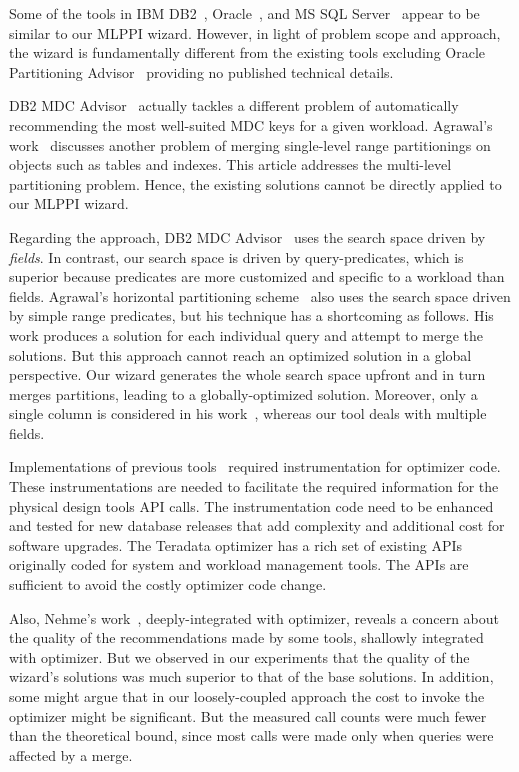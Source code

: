 \documentclass[paper]{ieice}
\begin{document}
Some of the tools in IBM DB2~\cite{Lightstone04:db2auto}, 
Oracle~\cite{sheet2009oracle}, and MS SQL Server~\cite{agrawal04:integrating} 
appear to be similar to our MLPPI wizard. 
However, in light of problem scope and approach, the wizard 
is fundamentally different from the existing tools excluding Oracle Partitioning \hbox{Advisor}~\cite{sheet2009oracle} 
providing no published technical details. 

DB2 MDC Advisor~\cite{Lightstone04:db2auto} actually tackles 
a different problem of automatically recommending the most well-suited MDC 
keys for a given workload. 
Agrawal's work~\cite{agrawal04:integrating} 
discusses another problem of merging \hbox{single-level} range partitionings on objects such as tables and indexes. 
This article addresses the multi-level \hbox{partitioning} problem. 
Hence, the existing solutions cannot be directly applied to our MLPPI wizard.   

Regarding the approach, DB2 MDC Advisor~\cite{Lightstone04:db2auto} uses 
the search space driven by {\em fields}. In contrast, our search 
space is driven by query-predicates, which is superior because 
\hbox{predicates} are more customized and specific to a workload than fields. 
Agrawal's horizontal partitioning scheme~\cite{agrawal04:integrating} 
also uses the search space driven by simple range predicates, but 
his technique has a \hbox{shortcoming} as follows. 
His work produces a solution for each individual query and attempt 
to merge the solutions. But this approach cannot reach 
an optimized solution in a global \hbox{perspective}.
Our wizard generates the whole search space upfront and in turn merges partitions, leading to a globally-optimized \hbox{solution}. 
Moreover, only a single column is considered in his work~\cite{agrawal04:integrating}, 
whereas our tool deals with multiple fields. 

Implementations of previous tools~\cite{agrawal04:integrating,Lightstone04:db2auto,nehme2011automated} \hbox{required} instrumentation for optimizer code.
These instrumentations are needed to facilitate the required 
information for the physical design tools API calls. 
The \hbox{instrumentation} code need to be enhanced and tested for new database 
releases that add complexity and additional cost for software upgrades. 
The Teradata optimizer has a rich set of existing APIs originally coded 
for system and workload management tools. 
The APIs are sufficient to avoid the costly optimizer code change. 

Also, Nehme's work~\cite{nehme2011automated}, deeply-integrated with 
optimizer, reveals a concern about the quality of the recommendations 
made by some tools, shallowly integrated with optimizer. 
But we observed in our experiments that the quality of 
the wizard's solutions was much superior to that of the base solutions. 
In addition, some might argue that in our loosely-coupled approach 
the cost to invoke the optimizer might be significant. 
But the measured call counts were much fewer than 
the theoretical bound, since most calls were made only when queries were affected by a merge.  
\end{document}

